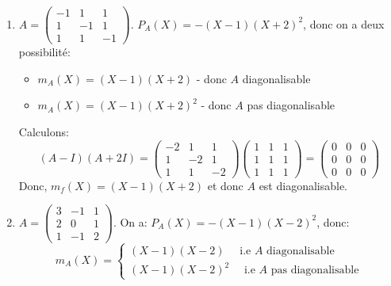 \begin{eg}
   \begin{enumerate}
       \item $A = \begin{pmatrix} 
            -1 & 1 & 1\\
            1  & -1 & 1\\
            1  & 1  & -1
           \end{pmatrix} $. $P_A(X) = -(X - 1)(X + 2)^2$, donc on a deux possibilité:
           \begin{itemize}
               \item $m_A(X) = (X - 1)(X + 2)$ - donc  $A$ diagonalisable
               \item  $m_A(X) = (X - 1)(X + 2)^2$ - donc $A$ pas diagonalisable
           \end{itemize}
           Calculons:
           \[
            (A - I)(A + 2I) = \begin{pmatrix} 
                -2 & 1 & 1\\
                1 & -2 & 1\\
                1 & 1  & -2
            \end{pmatrix}\begin{pmatrix} 
                1 & 1 & 1\\
                1 & 1 & 1\\
                1 & 1 & 1
            \end{pmatrix} = \begin{pmatrix} 
                0 & 0 & 0\\
                0 & 0 & 0\\
                0 & 0 & 0
            \end{pmatrix}   
           \] 
           Donc, $m_f(X) = (X - 1)(X + 2)$ et donc  $A$ est diagonalisable.
        \item  $A = \begin{pmatrix} 
                3 & -1 & 1\\
                2 & 0  & 1\\
                1 & -1 & 2
            \end{pmatrix} $. On a: $P_A(X) = -(X - 1)(X - 2)^2$, donc:
            \[
            m_A(X) = \begin{cases}
                (X-1)(X-2) \quad \text{ i.e $A$ diagonalisable}\\
                (X-1)(X-2)^2 \quad \text{ i.e $A$ pas diagonalisable}
            \end{cases}
\]
\end{enumerate}
\end{eg}
